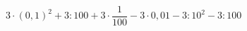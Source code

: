 \begin{ex}[type=calculate]
	\begin{condition}
		\( 3\cdot(0,1)^2+3:100+3\cdot\dfrac{1}{100}-3\cdot0,01-3:10^2-3:100\)
	\end{condition}
	\answer{}
\end{ex}